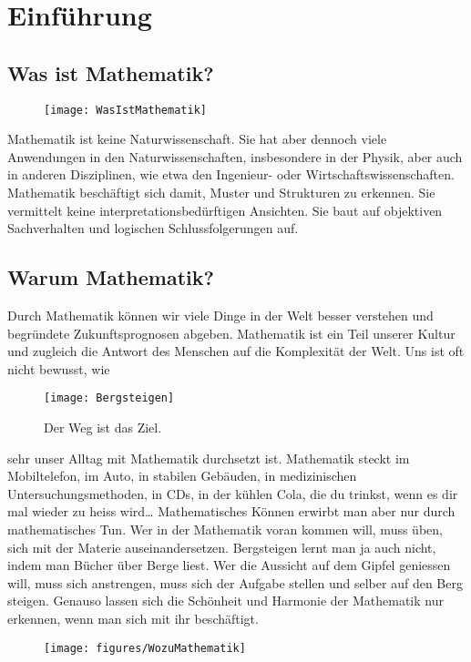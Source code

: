 \chapter{Einführung}

\section{Was ist Mathematik?}
\begin{wrapfigure}{r}{0.45\textwidth}
    \vspace{-.8cm}
	\begin{center}
		\texttt{[image: WasIstMathematik]}
	\end{center}
\end{wrapfigure}
Mathematik ist keine Naturwissenschaft. Sie hat aber dennoch viele Anwendungen in den Naturwissenschaften, insbesondere in der Physik, aber auch in anderen Disziplinen, wie etwa den Ingenieur- oder Wirtschaftswissenschaften.
Mathematik beschäftigt sich damit, Muster und Strukturen zu erkennen. 
Sie vermittelt keine interpretationsbedürftigen Ansichten.
Sie baut auf objektiven Sachverhalten und logischen Schlussfolgerungen auf.\par

\section{Warum Mathematik?}
Durch Mathematik können wir viele Dinge in der Welt besser verstehen und begründete Zukunftsprognosen abgeben.
Mathematik ist ein Teil unserer Kultur und zugleich die Antwort des Menschen auf die Komplexität der Welt.
Uns ist oft nicht bewusst, wie
\begin{wrapfigure}{l}{0.5\textwidth}
    \vspace{-.4cm}
	\begin{center}
		\texttt{[image: Bergsteigen]}
	\end{center}
	\caption{Der Weg ist das Ziel.}
\end{wrapfigure}
sehr unser Alltag mit Mathematik durchsetzt ist.
Mathematik steckt im Mobiltelefon, im Auto, in stabilen Gebäuden, in medizinischen Untersuchungsmethoden, in CDs, in der kühlen Cola, die du trinkst, wenn es dir mal wieder zu heiss wird\ldots
Mathematisches Können erwirbt man aber nur durch mathematisches Tun. Wer in der Mathematik voran kommen will, muss üben, sich mit der Materie auseinandersetzen. Bergsteigen lernt man ja auch nicht, indem man Bücher über Berge liest.
Wer die Aussicht auf dem Gipfel geniessen will, muss sich anstrengen, muss sich der Aufgabe stellen und selber auf den Berg steigen.
Genauso lassen sich die Schönheit und Harmonie der Mathematik nur erkennen, wenn man sich mit ihr beschäftigt.

\begin{figure}
\texttt{[image: figures/WozuMathematik]}
\end{figure}
\thispagestyle{empty}
